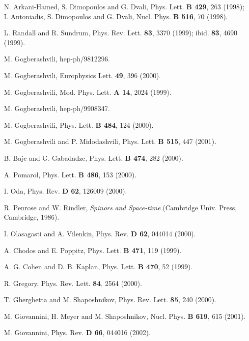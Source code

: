 \documentclass[a4paper,a4paper]{article}
\begin{document}
\begin{thebibliography}{17}

 N. Arkani-Hamed, S. Dimopoulos and G. Dvali,
Phys. Lett. {\bf B 429}, 263 (1998);
\\
I. Antoniadis, S. Dimopoulos and G. Dvali,
Nucl. Phys. {\bf B 516}, 70 (1998).

 L. Randall and R. Sundrum,
Phys. Rev. Lett. {\bf 83}, 3370 (1999); ibid. {\bf 83}, 4690 (1999).

 M. Gogberashvili, hep-ph/9812296.

 M. Gogberashvili,
Europhysics Lett. {\bf 49}, 396 (2000).

 M. Gogberashvili,
Mod. Phys. Lett. {\bf A 14}, 2024 (1999).

 M. Gogberashvili, hep-ph/9908347.

 M. Gogberashvili,
Phys. Lett. {\bf B 484}, 124 (2000).

 M. Gogberashvili and P. Midodashvili,
Phys. Lett. {\bf B 515}, 447 (2001).

 B. Bajc and G. Gabadadze,
Phys. Lett. {\bf B 474}, 282 (2000).

 A. Pomarol,
Phys. Lett. {\bf B 486}, 153 (2000).

 I. Oda,
Phys. Rev. {\bf D 62}, 126009 (2000).

 R. Penrose and W. Rindler,
{\it Spinors and Space-time} (Cambridge Univ. Press, Cambridge,
1986).

 I. Olasagasti and A. Vilenkin,
Phys. Rev. {\bf D 62}, 044014 (2000).

 A. Chodos and E. Poppitz,
Phys. Lett. {\bf B 471}, 119 (1999).

 A. G. Cohen and D. B. Kaplan,
Phys. Lett. {\bf B 470}, 52 (1999).

 R. Gregory,
Phys. Rev. Lett. {\bf 84}, 2564 (2000).

 T. Gherghetta and M. Shaposhnikov,
Phys. Rev. Lett. {\bf 85}, 240 (2000).

 M. Giovannini, H. Meyer and M. Shaposhnikov,
Nucl. Phys. {\bf B 619}, 615 (2001).

 M. Giovannini,
Phys. Rev. {\bf D 66}, 044016 (2002).

\end{thebibliography}
\end{document}
